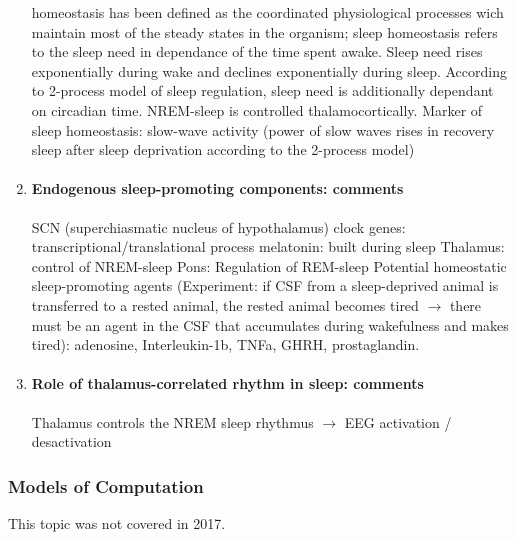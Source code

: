 \documentclass[12pt,article,oneside,a4paper]{memoir}
\begin{document}
\begin{enumerate}
homeostasis has been defined as the coordinated physiological processes wich maintain most of the steady states in the organism; sleep homeostasis refers to the sleep need in dependance of the time spent awake. Sleep need rises exponentially during wake and declines exponentially during sleep. According to 2-process model of sleep regulation, sleep need is additionally dependant on circadian time.
	NREM-sleep is controlled thalamocortically.
        	Marker of sleep homeostasis: slow-wave activity (power of slow waves rises in recovery sleep after sleep deprivation according to the 2-process model)

\item \paragraph{Endogenous sleep-promoting components: comments}

SCN (superchiasmatic nucleus of hypothalamus)
	clock genes: transcriptional/translational process
	melatonin: built during sleep
	Thalamus: control of NREM-sleep
	Pons: Regulation of REM-sleep
	Potential homeostatic sleep-promoting agents (Experiment: if CSF from a sleep-deprived animal is transferred to a rested animal, the rested animal becomes tired $\rightarrow$ there must be an agent in the CSF that accumulates during wakefulness and makes tired): adenosine, Interleukin-1b, TNFa, GHRH, prostaglandin.

\item \paragraph{Role of thalamus-correlated rhythm in sleep: comments}

Thalamus controls the NREM sleep rhythmus $\rightarrow$ EEG activation / desactivation
\end{enumerate}

\subsubsection{Models of Computation}
This topic was not covered in 2017.
\end{document}
